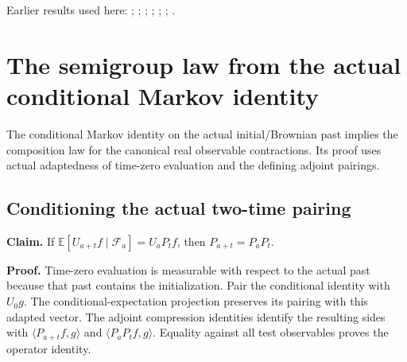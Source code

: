 \documentclass[11pt,a4paper]{report}
\begin{document}
Earlier results used here: \cite[Section~3.13.2]{LangevinLean2026ULASC}; \cite[Section~3.25.1]{LangevinLean2026ULASC}; \cite[Section~3.32.13]{LangevinLean2026ULASC}; \cite[Section~3.44.1]{LangevinLean2026ULASC}; \cite[Section~3.54.2]{LangevinLean2026ULASC}; \cite[Section~3.54.6]{LangevinLean2026ULASC}; \cite[Section~3.54.7]{LangevinLean2026ULASC}.
\section{\texorpdfstring{The semigroup law from the actual conditional Markov identity}{The semigroup law from the actual conditional Markov identity}}
\label{proof-module-WassersteinMixing-SemigroupComposition-lean}


The conditional Markov identity on the actual initial/\allowbreak{}Brownian past implies the composition law for the canonical real observable contractions. Its proof uses actual adaptedness of time-zero evaluation and the defining adjoint pairings.

\subsection{\texorpdfstring{Conditioning the actual two-time pairing}{Conditioning the actual two-time pairing}}
\label{report-step-WassersteinMixing-SemigroupComposition-lean-1}


\textbf{Claim.} If \(\mathbb E[U_{a+t}f\mid\mathcal F_a]=U_aP_tf\), then \(P_{a+t}=P_aP_t\).



\textbf{Proof.} Time-zero evaluation is measurable with respect to the actual past because that past contains the initialization. Pair the conditional identity with \(U_0g\). The conditional-expectation projection preserves its pairing with this adapted vector. The adjoint compression identities identify the resulting sides with \(\langle P_{a+t}f,g\rangle\) and \(\langle P_aP_tf,g\rangle\). Equality against all test observables proves the operator identity.
\end{document}
